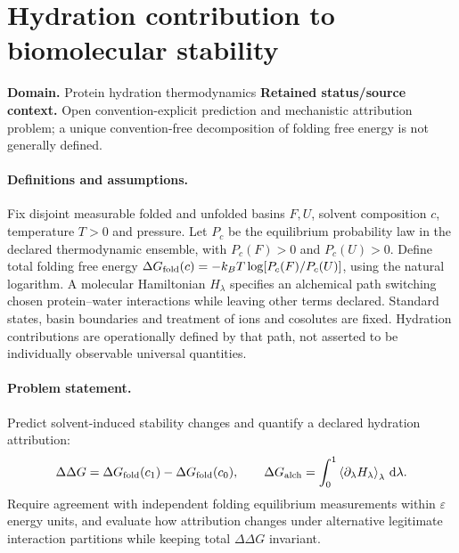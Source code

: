 \documentclass[11pt]{article}
\begin{document}
\section*{Hydration contribution to biomolecular stability}
\label{prob:092}
\label{rank:136}
\par\smallskip

\noindent\textbf{Domain.} Protein hydration thermodynamics \quad \textbf{Retained status/source context.} Open convention-explicit prediction and mechanistic attribution problem; a unique convention-free decomposition of folding free energy is not generally defined.
\paragraph{Definitions and assumptions.} Fix disjoint measurable folded and unfolded basins $F,U$, solvent composition $c$, temperature $T>0$ and pressure. Let $P_c$ be the equilibrium probability law in the declared thermodynamic ensemble, with $P_c(F)>0$ and $P_c(U)>0$. Define total folding free energy $\Delta G_{\rm fold}(c)=-k_BT\log[P_c(F)/P_c(U)]$, using the natural logarithm. A molecular Hamiltonian $H_\lambda$ specifies an alchemical path switching chosen protein--water interactions while leaving other terms declared. Standard states, basin boundaries and treatment of ions and cosolutes are fixed. Hydration contributions are operationally defined by that path, not asserted to be individually observable universal quantities.
\paragraph{Problem statement.} Predict solvent-induced stability changes and quantify a declared hydration attribution:
\[\Delta\Delta G=\Delta G_{\rm fold}(c_1)-\Delta G_{\rm fold}(c_0),\qquad \Delta G_{\rm alch}=\int_0^1\left\langle\partial_\lambda H_\lambda\right\rangle_\lambda\,\mathrm{d}\lambda.\]
Require agreement with independent folding equilibrium measurements within $\varepsilon$ energy units, and evaluate how attribution changes under alternative legitimate interaction partitions while keeping total $\Delta\Delta G$ invariant.
\end{document}
